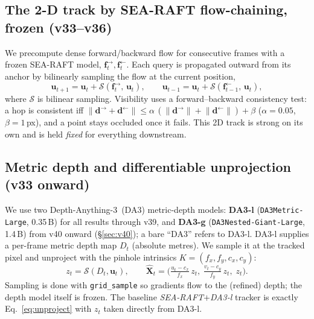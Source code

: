 \documentclass[11pt,a4paper]{article}
\begin{document}
\subsection{The 2-D track by SEA-RAFT flow-chaining, frozen (v33--v36)}
We precompute dense forward/backward flow for consecutive frames with a frozen SEA-RAFT model,
$\mathbf{f}^{\rightarrow}_t,\mathbf{f}^{\leftarrow}_t$. Each query is propagated outward from its
anchor by bilinearly sampling the flow at the current position,
\begin{equation}
\mathbf{u}_{t+1} = \mathbf{u}_t + \mathcal{S}\!\left(\mathbf{f}^{\rightarrow}_t,\,\mathbf{u}_t\right),
\qquad
\mathbf{u}_{t-1} = \mathbf{u}_t + \mathcal{S}\!\left(\mathbf{f}^{\leftarrow}_{t-1},\,\mathbf{u}_t\right),
\end{equation}
where $\mathcal{S}$ is bilinear sampling. Visibility uses a forward--backward consistency test:
a hop is consistent iff $\lVert \mathbf{d}^{\rightarrow}+\mathbf{d}^{\leftarrow}\rVert \le
\alpha\,(\lVert\mathbf{d}^{\rightarrow}\rVert+\lVert\mathbf{d}^{\leftarrow}\rVert)+\beta$
($\alpha{=}0.05$, $\beta{=}1$\,px), and a point stays occluded once it fails. This 2D track is
strong on its own and is held \emph{fixed} for everything downstream.

\subsection{Metric depth and differentiable unprojection (v33 onward)}
We use two Depth-Anything-3~(DA3) metric-depth models: \textbf{DA3-l} (\texttt{DA3Metric-Large},
0.35\,B) for all results through v39, and \textbf{DA3-g} (\texttt{DA3Nested-Giant-Large}, 1.4\,B)
from v40 onward (\S\ref{sec:v40}); a bare ``DA3'' refers to DA3-l.
DA3-l supplies a per-frame metric depth map $D_t$ (absolute metres). We sample it at the tracked
pixel and unproject with the pinhole intrinsics $K=(f_x,f_y,c_x,c_y)$:
\begin{equation}
z_t = \mathcal{S}(D_t,\mathbf{u}_t),\qquad
\hat{\mathbf X}_t = \Big(\tfrac{u_t-c_x}{f_x}\,z_t,\;\tfrac{v_t-c_y}{f_y}\,z_t,\;z_t\Big).
\label{eq:unproject}
\end{equation}
Sampling is done with \texttt{grid\_sample} so gradients flow to the (refined) depth; the depth
model itself is frozen. The baseline \emph{SEA-RAFT$+$DA3-l} tracker is exactly
Eq.~\eqref{eq:unproject} with $z_t$ taken directly from DA3-l.

\end{document}
